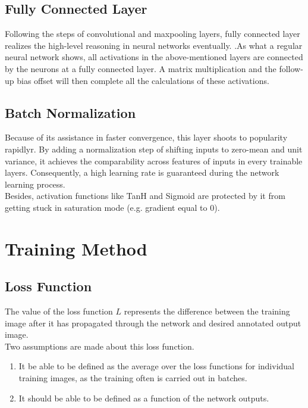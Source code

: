     \subsection{Fully Connected Layer}
    Following the steps of convolutional and maxpooling layers, fully connected layer realizes the high-level reasoning in neural networks eventually. .As what a regular neural network shows, all activations in the above-mentioned layers are connected by the neurons at a fully connected layer. A matrix multiplication and the follow-up bias offset will then complete all the calculations of these activations.

    \subsection{Batch Normalization}
    \label{batchnor}
    Because of its assistance in faster convergence, this layer shoots to popularity rapidlyr\cite{ioffe2015batch}. By adding  a normalization step of shifting inputs to zero-mean and unit variance, it achieves the comparability across features of inputs in every trainable layers. Consequently, a high learning rate is guaranteed during the network learning process. \\

    Besides, activation functions like TanH and Sigmoid are protected by it from getting stuck in saturation mode (e.g. gradient equal to $0$).

    \section{Training Method}
    \label{training}
    \subsection{Loss Function}
    The value of the loss function $L$ represents the difference between the training image after it has propagated through the network and desired annotated output image.\\ 

    Two assumptions are made about this loss function. 
    \begin{enumerate}
        \item It be able to be defined as the average over the loss functions for individual training images, as the training often is carried out in batches.
        \item It should be able to be defined as a function of the network outputs. 
    \end{enumerate}

